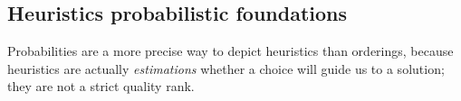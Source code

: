 \documentclass{ws-ijait}
\begin{document}
%

\subsection{Heuristics probabilistic foundations}

Probabilities are a more precise way to depict heuristics
than orderings, because heuristics are actually
\emph{estimations} whether a choice will guide us to a
solution; they are not a strict quality rank.
\end{document}
